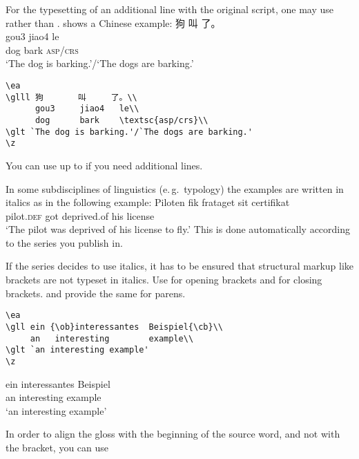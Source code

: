 For the typesetting of an additional line with the original script, one may use  rather
than .  shows a Chinese example:
\ea
\label{ex:shown:chinese}
\glll 狗       叫     了。\\
      gou3     jiao4   le\\
      dog      bark    \textsc{asp/crs}\\
\glt `The dog is barking.'/`The dogs are barking.'
\z

\begin{verbatim}
\ea
\glll 狗       叫     了。\\
      gou3     jiao4   le\\
      dog      bark    \textsc{asp/crs}\\
\glt `The dog is barking.'/`The dogs are barking.'
\z
\end{verbatim}

You can use up to  if you need additional lines.

In some subdisciplines of linguistics (e.\,g.\ typology) the examples are written in italics as in the
following example:
\ea
\def\exfont{\normalsize\it}
\gll Piloten         fik frataget    sit certifikat\footnotemark\\
     pilot.{\scshape def} got deprived.of his license\\
\glt `The pilot was deprived of his license to fly.'
\z 
This is done automatically according to the series you publish in. 

If the series decides to use italics, it has to be ensured that structural markup like brackets are not typeset in italics. Use  for opening brackets and  for closing brackets.  and  provide the same for parens.
\begin{verbatim}
\ea
\gll ein {\ob}interessantes  Beispiel{\cb}\\
     an   interesting        example\\
\glt `an interesting example'
\z 
\end{verbatim}
\ea
\def\exfont{\normalsize\it}
\gll ein {\ob}interessantes       Beispiel{\cb}\\
     an   interesting example\\
\glt `an interesting example'
\z 
{}

In order to align the gloss with the beginning of the source word, and not with the bracket, you can use \computer{{\bs}hspaceThis\{[\}}

